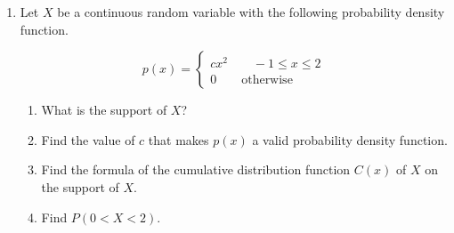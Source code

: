 \documentclass[11pt]{article}
\begin{document}
\begin{enumerate}

\item[\textbf{P2.}]
Let $X$ be a continuous random variable with the following probability density function.

\[p(x)=\begin{cases}cx^2\qquad -1\le x\le 2\\ 0 \qquad \text{otherwise}\end{cases}\]

\begin{enumerate}
    \item What is the support of $X$?

    \vfill

    \item Find the value of $c$ that makes $p(x)$ a valid probability density function.

    \vfill
    
    \item Find the formula of the cumulative distribution function $C(x)$ of $X$ on the support of $X$.

    \vfill

    \item Find $P(0<X<2)$.

    \vfill
\end{enumerate}

\end{enumerate}
\end{document}
